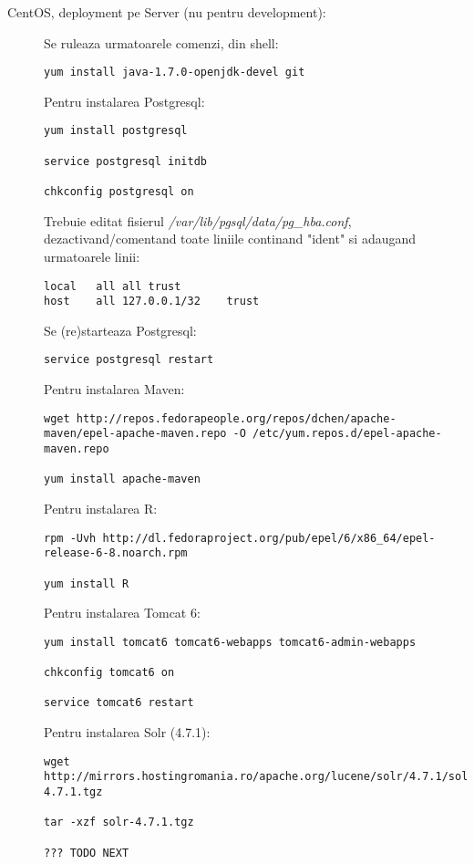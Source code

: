 \begin{description}
\item[CentOS, deployment pe Server (nu pentru development):]
Se ruleaza urmatoarele comenzi, din shell:
\begin{lstlisting}[breaklines=true]
yum install java-1.7.0-openjdk-devel git
\end{lstlisting}

Pentru instalarea Postgresql:
\begin{lstlisting}[breaklines=true]
yum install postgresql 

service postgresql initdb

chkconfig postgresql on
\end{lstlisting}

Trebuie editat fisierul \emph{ /var/lib/pgsql/data/pg\_hba.conf}, 
dezactivand/comentand toate liniile continand "ident" si adaugand urmatoarele linii: 
\begin{lstlisting}[breaklines=true]
local	all	all	trust
host	all	127.0.0.1/32	trust
\end{lstlisting}

Se (re)starteaza Postgresql:
\begin{lstlisting}[breaklines=true]
service postgresql restart
\end{lstlisting}

Pentru instalarea Maven:
\begin{lstlisting}[breaklines=true]
wget http://repos.fedorapeople.org/repos/dchen/apache-maven/epel-apache-maven.repo -O /etc/yum.repos.d/epel-apache-maven.repo

yum install apache-maven
\end{lstlisting}

Pentru instalarea R:
\begin{lstlisting}[breaklines=true]
rpm -Uvh http://dl.fedoraproject.org/pub/epel/6/x86_64/epel-release-6-8.noarch.rpm

yum install R
\end{lstlisting}

Pentru instalarea Tomcat 6:
\begin{lstlisting}[breaklines=true]
yum install tomcat6 tomcat6-webapps tomcat6-admin-webapps

chkconfig tomcat6 on

service tomcat6 restart
\end{lstlisting}

Pentru instalarea Solr (4.7.1):
\begin{lstlisting}[breaklines=true]
wget http://mirrors.hostingromania.ro/apache.org/lucene/solr/4.7.1/solr-4.7.1.tgz

tar -xzf solr-4.7.1.tgz

??? TODO NEXT
\end{lstlisting}

\end{description}


